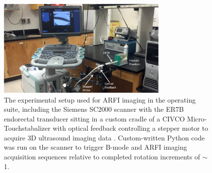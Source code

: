 \begin{figure}[htb!]
\centering
\includegraphics[width=0.75\textwidth]{figs/setup_annotated.png}
\caption{The experimental setup used for ARFI imaging in the operating suite,
    including the Siemens SC2000 scanner with the ER7B endorectal transducer
    sitting in a custom cradle of a CIVCO Micro-Touch\texttrademark stabalizer
    with optical feedback controlling a stepper motor to acquire 3D ultrasound
    imaging data \invivo.  Custom-written Python code was run on the scanner to
    trigger B-mode and ARFI imaging acquisition sequences relative to completed
    rotation increments of $\sim$1\degree.}
\label{fig:setup_annotated} 
\end{figure}
